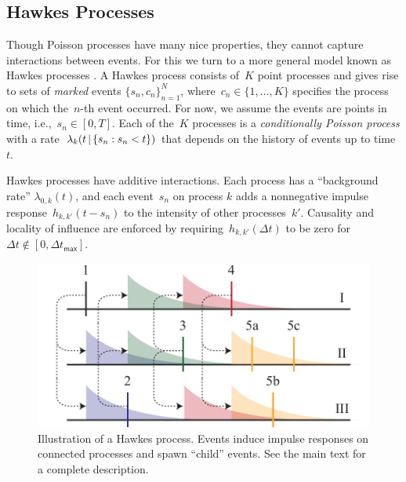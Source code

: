 \subsection{Hawkes Processes}
Though Poisson processes have many nice properties, they cannot capture interactions between events. For this we turn to a more general model known as Hawkes processes \cite{Hawkes-1971}. A Hawkes process consists of~$K$ point processes and gives rise to sets of \emph{marked} events $\{s_n,c_n\}_{n=1}^N$, where~${c_n\in\{1,\ldots,K\}}$ specifies the process on which the~$n$-th event occurred. For now, we assume the events are points in time, i.e.,~${s_n\in[0,T]}$. 
Each of the~$K$ processes is a \emph{conditionally Poisson process} with a rate~${\lambda_k(t\,|\, \{s_n:s_n<t\})}$ that depends on the history of events up to time~$t$.

Hawkes processes have additive interactions. Each process has a ``background rate'' $\lambda_{0,k}(t)$, and each event~$s_n$ on process $k$ adds a nonnegative impulse response~$h_{k,k'}(t-s_n)$ to the intensity of other processes~$k'$. Causality and locality of influence are enforced by requiring~$h_{k,k'}(\Delta t)$ to be zero for~${\Delta t \notin[0,\Delta t_{\mathsf{max}}]}$. 
\begin{figure}[t]
\centering%
\includegraphics[width=\linewidth]{figures/ch2/Hawkes-wide} 
\vspace{-0.25cm}
\caption[Illustration of a Hawkes process]{Illustration of a Hawkes process. Events induce impulse responses on connected processes and spawn ``child'' events. See the main text for a complete description.}
\label{fig:hawkes}
\vspace{-0.5cm}
\end{figure}

